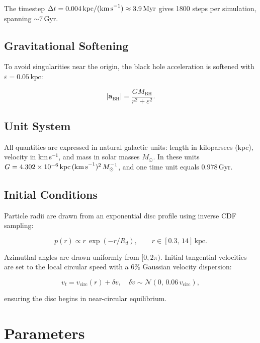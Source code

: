 \documentclass[12pt, letterpaper]{article}
\begin{document}
The timestep $\Delta t = 0.004\,\text{kpc/(km\,s}^{-1}) \approx 3.9\,\text{Myr}$ gives 1800 steps per simulation, spanning $\sim\!7\,\text{Gyr}$.

\subsection{Gravitational Softening}

To avoid singularities near the origin, the black hole acceleration is softened with $\varepsilon = 0.05\,\text{kpc}$:

\begin{equation}
    |\mathbf{a}_\text{BH}| = \frac{G M_\text{BH}}{r^2 + \varepsilon^2}.
\end{equation}

\subsection{Unit System}

All quantities are expressed in natural galactic units: length in kiloparsecs (kpc), velocity in km\,s$^{-1}$, and mass in solar masses $M_\odot$. In these units $G = 4.302 \times 10^{-6}\,\text{kpc\,(km\,s}^{-1})^2\,M_\odot^{-1}$, and one time unit equals $0.978\,\text{Gyr}$.

\subsection{Initial Conditions}

Particle radii are drawn from an exponential disc profile using inverse CDF sampling:

\begin{equation}
    p(r) \propto r\,\exp\!\left(-r/R_d\right), \qquad r \in [0.3,\,14]\,\text{kpc}.
\end{equation}

Azimuthal angles are drawn uniformly from $[0, 2\pi)$. Initial tangential velocities are set to the local circular speed with a 6\% Gaussian velocity dispersion:

\begin{equation}
    v_t = v_\text{circ}(r) + \delta v, \quad \delta v \sim \mathcal{N}(0,\, 0.06\, v_\text{circ}),
\end{equation}

ensuring the disc begins in near-circular equilibrium.

\section{Parameters}
\label{sec:params}
\end{document}
